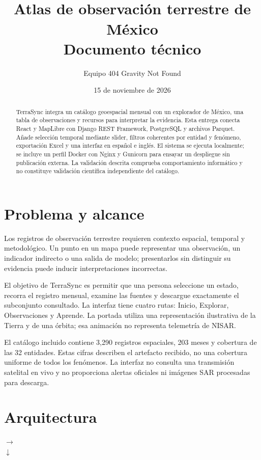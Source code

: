 \documentclass[11pt,a4paper]{article}
\title{\textcolor{forest}{\Huge\proyecto}\\[8pt]Atlas de observación terrestre de México\\[8pt]\large Documento técnico}
\author{Equipo 404 Gravity Not Found}
\date{15 de noviembre de 2026}
\newcommand{\proyecto}{TerraSync}
\begin{document}
\maketitle
\begin{abstract}
\proyecto{} integra un catálogo geoespacial mensual con un explorador de México, una tabla de observaciones y recursos para interpretar la evidencia. Esta entrega conecta React y MapLibre con Django REST Framework, PostgreSQL y archivos Parquet. Añade selección temporal mediante slider, filtros coherentes por entidad y fenómeno, exportación Excel y una interfaz en español e inglés. El sistema se ejecuta localmente; se incluye un perfil Docker con Nginx y Gunicorn para ensayar un despliegue sin publicación externa. La validación descrita comprueba comportamiento informático y no constituye validación científica independiente del catálogo.
\end{abstract}
\tableofcontents
\newpage
\section{Problema y alcance}
Los registros de observación terrestre requieren contexto espacial, temporal y metodológico. Un punto en un mapa puede representar una observación, un indicador indirecto o una salida de modelo; presentarlos sin distinguir su evidencia puede inducir interpretaciones incorrectas.

El objetivo de \proyecto{} es permitir que una persona seleccione un estado, recorra el registro mensual, examine las fuentes y descargue exactamente el subconjunto consultado. La interfaz tiene cuatro rutas: Inicio, Explorar, Observaciones y Aprende. La portada utiliza una representación ilustrativa de la Tierra y de una órbita; esa animación no representa telemetría de NISAR.

El catálogo incluido contiene 3,290 registros espaciales, 203 meses y cobertura de las 32 entidades. Estas cifras describen el artefacto recibido, no una cobertura uniforme de todos los fenómenos. La interfaz no consulta una transmisión satelital en vivo y no proporciona alertas oficiales ni imágenes SAR procesadas para descarga.

\section{Arquitectura}
\begin{center}
\quad$\longrightarrow$\quad{}\\[10pt]
\hspace*{55mm}$\downarrow$\\[6pt]
\hspace*{35mm}
\end{center}
\end{document}
